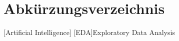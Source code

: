 \chapter*{Abkürzungsverzeichnis} 

\begin{acronym}
	
	[Artificial Intelligence]
	[EDA]{Exploratory Data Analysis}
	
\end{acronym}
